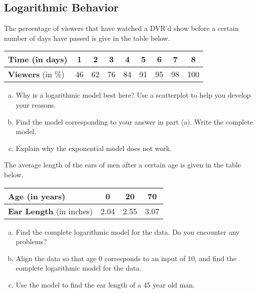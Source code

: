 \documentclass[notes]{subfiles}
\begin{document}
	\subsection*{Logarithmic Behavior}
		\begin{ex}
			The percentage of viewers that have watched a DVR'd show before a certain number of days have passed is give in the table below.
			\begin{center}
				{\renewcommand{\arraystretch}{1.2}
				\begin{tabular}{|l|c|c|c|c|c|c|c|c|}\hline
					\textbf{Time} (in days) & 1 & 2 & 3 & 4 & 5 & 6 & 7 & 8\\ \hline
					\textbf{Viewers} (in \%) & 46 & 62 & 76 & 84 & 91 & 95 & 98 & 100\\ \hline
				\end{tabular}
				}
			\end{center}
			\begin{enumerate}[(a)]
				\item Why is a logarithmic model best here?  Use a scatterplot to help you develop your reasons.
				\item Find the model corresponding to your answer in part (a). Write the complete model.
				\item Explain why the exponential model does not work.
			\end{enumerate}
		\end{ex}
			\newpage

		\begin{ex}
			The average length of the ears of men after a certain age is given in the table below.
			\begin{center}
				{\renewcommand{\arraystretch}{1.2}
				\begin{tabular}{|l|c|c|c|}\hline
					\textbf{Age} (in years) & 0 & 20 & 70 \\ \hline
					\textbf{Ear Length} (in inches) & 2.04 & 2.55 & 3.07\\ \hline
				\end{tabular}
				}
			\end{center}
			\begin{enumerate}[(a)]
				\item Find the complete logarithmic model for the data.  Do you encounter any problems?
					\vs{.5}
				\item Align the data so that age 0 corresponds to an input of 10, and find the complete logarithmic model for the data.
					\vs{1}
				\item Use the model to find the ear length of a 45 year old man.
					\vs{.5}
			\end{enumerate}
		\end{ex}
		
\end{document}
